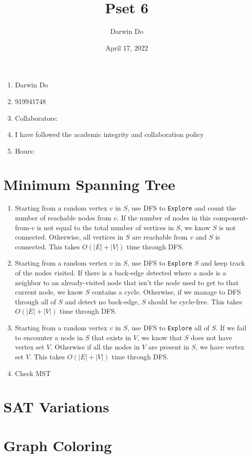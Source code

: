 \documentclass{article}
\title{Pset 6}
\begin{document}
\newcommand{\Not}{\textbf{not}}
\newcommand{\AAnd}{\textbf{and}}
\newcommand{\Or}{\textbf{or}}
\newcommand{\True}{\texttt{True}}
\newcommand{\False}{\texttt{False}}

\date{April 17, 2022 }
\author{Darwin Do}

\maketitle

\begin{enumerate}
    \item Darwin Do
    \item 919941748
    \item Collaborators: 
    \item I have followed the academic integrity and collaboration policy
    \item Hours: 
\end{enumerate}

\newpage

\section{Minimum Spanning Tree}
\begin{enumerate}
    \item Starting from a random vertex $v$ in $S$, use DFS to \texttt{Explore} and count the number of reachable nodes from $v$.
            If the number of nodes in this component-from-$v$ is not equal to the total number of vertices in $S$, we know $S$ is not connected.
            Otherwise, all vertices in $S$ are reachable from $v$ and $S$ is connected. This takes $O(|E| + |V|)$ time through DFS.

    \item Starting from a random vertex $v$ in $S$, use DFS to \texttt{Explore} $S$ and keep track of the nodes visited. 
            If there is a back-edge detected where a node is a neighbor to an already-visited node that isn't the node used to get to that current node, we know $S$ contains a cycle.
            Otherwise, if we manage to DFS through all of $S$ and detect no back-edge, $S$ should be cycle-free. This takes $O(|E| + |V|)$ time through DFS.
            
    \item Starting from a random vertex $v$ in $S$, use DFS to \texttt{Explore} all of $S$. If we fail to encounter a node in $S$ that exists in $V$, we know that $S$ does not have vertex set $V$.
            Otherwise if all the nodes in $V$ are present in $S$, we have vertex set $V$. This takes $O(|E| + |V|)$ time through DFS.

    \item Check MST
\end{enumerate}

\newpage
\section{SAT Variations}

\newpage
\section{Graph Coloring}
\end{document}

